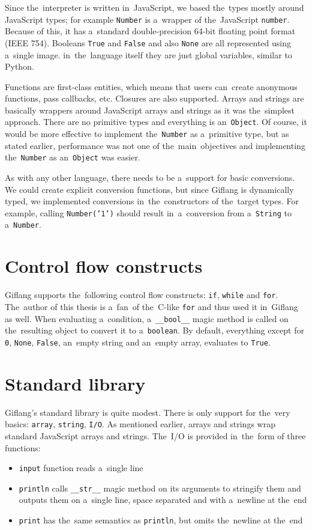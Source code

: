 Since the~interpreter is written in~JavaScript, we based the~types mostly around JavaScript types; for example \texttt{Number} is a~wrapper of the~JavaScript
\texttt{number}. Because of this, it has a~standard double-precision 64-bit floating point format (IEEE 754). Booleans \texttt{True} and \texttt{False}
and also \texttt{None} are all represented using a~single image. in~the~language itself they are just global variables, similar to Python.

Functions are first-class entities, which means that users can~create anonymous functions, pass callbacks, etc. Closures are also supported.
Arrays and strings are basically wrappers around JavaScript arrays and strings as it was the~simplest approach. There are no primitive types and everything is
an~\texttt{Object}. Of course, it would be more effective to implement the~\texttt{Number} as a~primitive type, but as stated earlier, performance was not one
of the~main~objectives and implementing the~\texttt{Number} as an~\texttt{Object} was easier.

As with any other language, there needs to be a~support for basic conversions. We could create explicit conversion functions, but since Giflang is dynamically typed,
we implemented conversions in~the~constructors of the~target types. For example, calling \texttt{Number('1')} should result in~a~conversion from a~\texttt{String} to
a~\texttt{Number}.

\section{Control flow constructs}
Giflang supports the~following control flow constructs: \texttt{if}, \texttt{while} and \texttt{for}. The~author of this thesis is a~fan~of the~C-like \texttt{for}
and thus used it in~Giflang as well. When evaluating a~condition, a~\texttt{\_\_bool\_\_} magic method is called on the~resulting object to convert it to
a~\texttt{boolean}. By default, everything except for \texttt{0}, \texttt{None}, \texttt{False}, an~empty string and an~empty array, evaluates to \texttt{True}.

\section{Standard library}
Giflang's standard library is quite modest. There is only support for the~very basics: \texttt{array}, \texttt{string}, \texttt{I/O}. As mentioned earlier, arrays
and strings wrap standard JavaScript arrays and strings. The~I/O is provided in~the~form of three functions:
\begin{itemize}
    \item \texttt{input} function reads a~single line
    \item \texttt{println} calls \texttt{\_\_str\_\_} magic method on its arguments to stringify them and outputs them on a~single line, space separated and
    with a~newline at the~end
    \item \texttt{print} has the~same semantics as \texttt{println}, but omits the~newline at the~end
\end{itemize}

